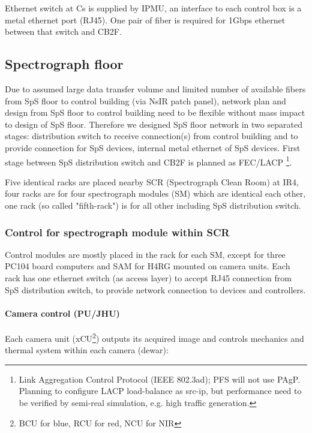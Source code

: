 \documentclass[a4paper,notitlepage]{article}
\begin{document}
Ethernet switch at Cs is supplied by IPMU, an interface to 
each control box is a metal ethernet port (RJ45). 
One pair of fiber is required for 1Gbps ethernet between that switch and CB2F. 

\subsection{Spectrograph floor}

Due to assumed large data transfer volume and limited number of available 
fibers from SpS floor to control building (via NsIR patch panel), 
network plan and design from SpS floor to control building need to be 
flexible without mass impact to design of SpS floor. 
Therefore we designed SpS floor network in two separated stages: distribution 
switch to receive connection(s) from control building and to provide connection 
for SpS devices, internal metal ethernet of SpS devices. 
First stage between SpS distribution switch and CB2F is planned as FEC/LACP
\footnote{Link Aggregation Control Protocol (IEEE 802.3ad); PFS will not use 
PAgP. Planning to configure LACP load-balance as src-ip, but performance 
need to be verified by semi-real simulation, e.g. high traffic generation.}. 

Five identical racks are placed nearby SCR (Spectrograph Clean Room) at IR4, 
four racks are for four spectrograph modules (SM) which are identical each 
other, one rack (so called "fifth-rack") is for all other including SpS 
distribution switch. 

\subsubsection{Control for spectrograph module within SCR}

Control modules are mostly placed in the rack for each SM, except for three 
PC104 board computers and SAM for H4RG mounted on camera units. 
Each rack has one ethernet switch (as access layer) to accept RJ45 connection 
from SpS distribution switch, to provide network connection to devices and 
controllers. 

\paragraph{Camera control (PU/JHU)}

Each camera unit (xCU\footnote{BCU for blue, RCU for red, NCU for NIR}) 
outputs its acquired image and controls mechanics and thermal system 
within each camera (dewar): 
\end{document}
